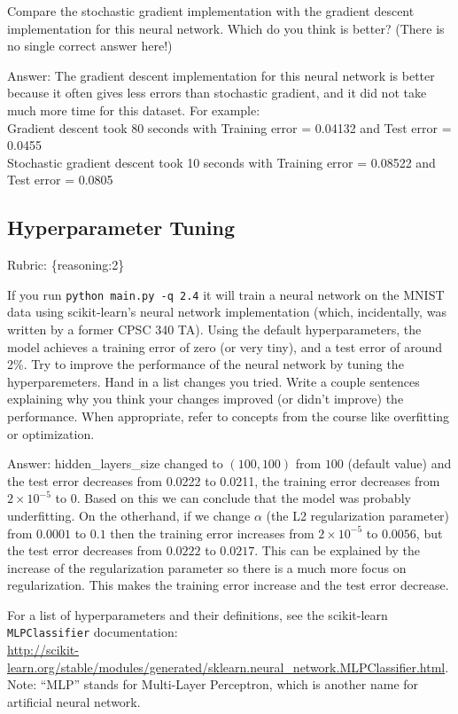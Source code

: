 \documentclass{article}
\def\rubric#1{\gre{Rubric: \{#1\}}}{}
\def\blu#1{{\color{blu}#1}}
\def\gre#1{{\color{gre}#1}}
\def\ans#1{\gre{Answer: #1}}{}
\begin{document}
Compare the stochastic gradient implementation with the gradient descent implementation for this neural network. Which do you think is better? (There is no single correct answer here!) 

\ans{The gradient descent implementation for this neural network is better because it often gives less errors than stochastic gradient, and it did not take much more time for this dataset. For example: \\
Gradient descent took 80 seconds with
Training error =  0.04132 and
Test error     =  0.0455 \\
Stochastic gradient descent took 10 seconds with
Training error =  0.08522 and
Test error     =  0.0805}

\subsection{Hyperparameter Tuning}
\rubric{reasoning:2}

If you run \texttt{python main.py -q 2.4} it will train a neural network on the MNIST data using scikit-learn's neural network implementation (which, incidentally, was written by a former CPSC 340 TA).
Using the default hyperparameters, the model achieves a training error of zero (or very tiny), and a test error of around 2\%. 
Try to improve the performance of the neural network by tuning the hyperparemeters.
\blu{Hand in a list changes you tried. Write a couple sentences explaining why you think your changes improved (or didn't improve) the performance. When appropriate, refer to concepts from the course like overfitting or optimization.}

\ans{hidden\_layers\_size changed to $(100,100)$ from $100$ (default value) and the test error decreases from 0.0222 to 0.0211, the training error decreases from $2 \times 10^{-5}$ to $0$. Based on this we can conclude that the model was probably underfitting. On the otherhand, if we change $\alpha$ (the L2 regularization parameter) from $0.0001$ to $0.1$ then the training error increases from $2 \times 10^{-5}$ to $0.0056$, but the test error decreases from $0.0222$ to $0.0217$. This can be explained by the increase of the regularization parameter so there is a much more focus on regularization. This makes the training error increase and the test error decrease.}

For a list of hyperparameters and their definitions, see the scikit-learn \texttt{MLPClassifier} documentation:\\
\url{http://scikit-learn.org/stable/modules/generated/sklearn.neural_network.MLPClassifier.html}. Note: ``MLP'' stands for Multi-Layer Perceptron,
which is another name for artificial neural network.
\end{document}
